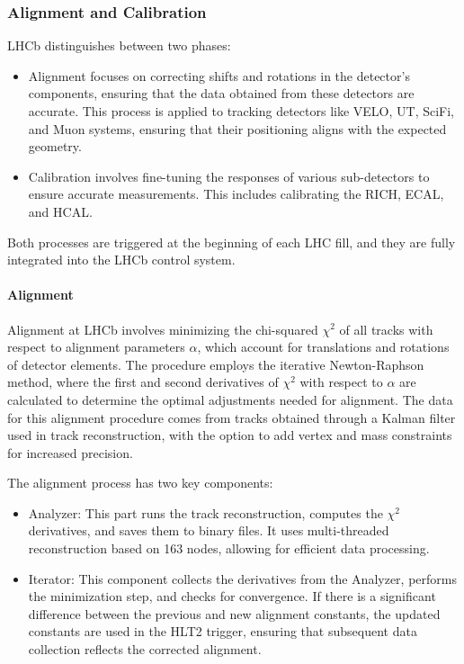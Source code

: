 \subsubsection{Alignment and Calibration}\label{sec:alignment}
LHCb distinguishes between two phases\cite{Dziurda:2640712}:
\begin{itemize}
\item Alignment focuses on correcting shifts and rotations in the detector's components, ensuring that the data obtained from these detectors are accurate. This process is applied to tracking detectors like VELO, UT, SciFi, and Muon systems, ensuring that their positioning aligns with the expected geometry.
\item Calibration involves fine-tuning the responses of various sub-detectors to ensure accurate measurements. This includes calibrating the RICH, ECAL, and HCAL.
\end{itemize}
Both processes are triggered at the beginning of each LHC fill, and they are fully integrated into the LHCb control system. 
\paragraph{Alignment}
Alignment at LHCb involves minimizing the chi-squared $\chi^2$ of all tracks with respect to alignment parameters $\alpha$, which account for translations and rotations of detector elements. The procedure employs the iterative Newton-Raphson method, where the first and second derivatives of $\chi^2$ with respect to 
 $\alpha$ are calculated to determine the optimal adjustments needed for alignment. The data for this alignment procedure comes from tracks obtained through a Kalman filter used in track reconstruction\cite{HULSBERGEN2009471}, with the option to add vertex and mass constraints for increased precision.

The alignment process has two key components\cite{Saur:20230E}:
\begin{itemize}
\item Analyzer: This part runs the track reconstruction, computes the $\chi^2$ derivatives, and saves them to binary files. It uses multi-threaded reconstruction based on 163 nodes, allowing for efficient data processing.
\item Iterator: This component collects the derivatives from the Analyzer, performs the minimization step, and checks for convergence. If there is a significant difference between the previous and new alignment constants, the updated constants are used in the HLT2 trigger, ensuring that subsequent data collection reflects the corrected alignment.
\end{itemize}
